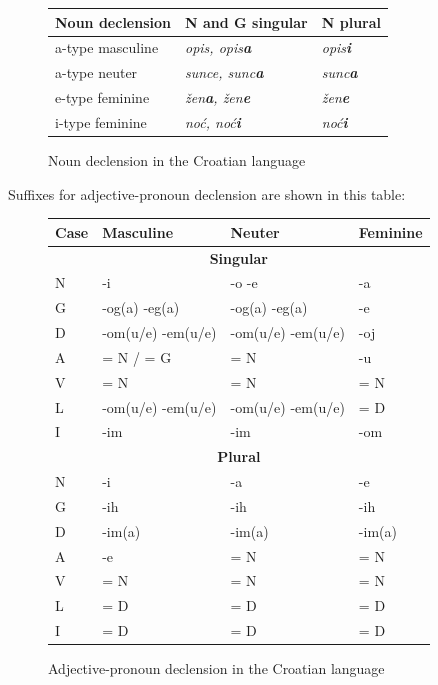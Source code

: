 \begin{multicols}{2}
\begin{figure}[htb]
\centering
	\begin{tabular}{|l|l|l|}
  \hline
  \textbf{Noun declension} & \textbf{N and G singular} & \textbf{N plural} \\ 
  \hline \hline
  a-type masculine    & \emph{opis, opis\textbf{a}}     &  \emph{opis\textbf{i}} \\ 
  \hline
  a-type neuter   & \emph{sunce, sunc\textbf{a}}     &  \emph{sunc\textbf{a}} \\ 
  \hline
  e-type feminine   & \emph{žen\textbf{a}, žen\textbf{e}}     &  \emph{žen\textbf{e}} \\
  \hline
  i-type feminine   & \emph{noć, noć\textbf{i}}     &  \emph{noć\textbf{i}} \\
  \hline
  \end{tabular}
  \caption{Noun declension in the Croatian language}
  \label{fig:imenicka_en}
\end{figure}

Suffixes for adjective-pronoun declension are shown in this table:

\begin{figure}[htb]
\centering
    \begin{tabular}{|l|l|l|l|}
        \hline
        \textbf{Case} & \textbf{Masculine}        & \textbf{Neuter}       & \textbf{Feminine} \\ \hline
		\multicolumn{4}{|c|}{\textbf{Singular}} \\ \hline
        N     & -i                & -o -e             & -a\\ 
        G     & -og(a) -eg(a)     & -og(a) -eg(a)     & -e\\ 
        D     & -om(u/e) -em(u/e) & -om(u/e) -em(u/e) & -oj\\ 
        A     & = N / = G         & = N               & -u\\ 
        V     & = N               & = N               & = N\\ 
        L     & -om(u/e) -em(u/e) & -om(u/e) -em(u/e) & = D\\ 
        I     & -im               & -im               & -om\\ \hline
		\multicolumn{4}{|c|}{\textbf{Plural}} \\ \hline
		N     & -i        & -a         & -e\\ 
        G     & -ih       & -ih        & -ih\\ 
        D     & -im(a)    & -im(a)     & -im(a)\\ 
        A     & -e        & = N        & = N\\ 
        V     & = N       & = N        & = N\\ 
        L     & = D       & = D        & = D\\ 
        I     & = D       & = D        & = D\\
        \hline
   \end{tabular}
  \caption{Adjective-pronoun declension in the Croatian language}
  \label{fig:zamjenicka_en}
\end{figure}


\end{multicols}
